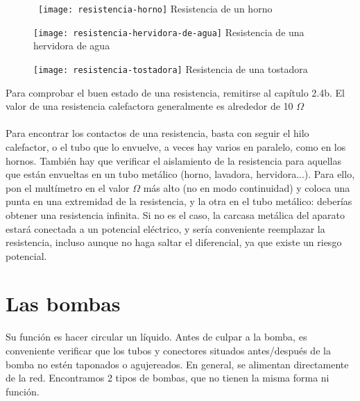 \begin{figure}[h]
\noindent\begin{minipage}[t]{0.26\textwidth}\vspace{0pt}\
\texttt{[image: resistencia-horno]}
Resistencia de un horno
\end{minipage}
\begin{minipage}[t]{0.26\textwidth}\vspace{0pt}
\texttt{[image: resistencia-hervidora-de-agua]}
Resistencia de una hervidora de agua
\end{minipage}
\begin{minipage}[t]{0.26\textwidth}\vspace{\fill}
\texttt{[image: resistencia-tostadora]}
Resistencia de una tostadora
\end{minipage}
\centering
\end{figure}
\vspace{1em}

Para comprobar el buen estado de una resistencia, remitirse al capítulo 2.4b. El valor de una resistencia calefactora generalmente es alrededor de 10 $\Omega$\\

\noindent{}\\

Para encontrar los contactos de una resistencia, basta con seguir el hilo calefactor, o el tubo que lo envuelve, a veces hay varios en paralelo, como en los hornos.
También hay que verificar el aislamiento de la resistencia para aquellas que están envueltas en un tubo metálico (horno, lavadora, hervidora...).
Para ello, pon el multímetro en el valor $\Omega$ más alto (no en modo continuidad) y coloca una punta en una extremidad de la resistencia, y la otra en el tubo metálico: deberías obtener una resistencia infinita.
Si no es el caso, la carcasa metálica del aparato estará conectada a un potencial eléctrico, y sería conveniente reemplazar la resistencia, incluso aunque no haga saltar el diferencial, ya que existe un riesgo potencial.
\newpage
\section{Las bombas}
Su función es hacer circular un líquido.
Antes de culpar a la bomba, es conveniente verificar que los tubos y conectores situados antes/después de la bomba no estén taponados o agujereados. En general, se alimentan directamente de la red. Encontramos 2 tipos de bombas, que no tienen la misma forma ni función.\\


